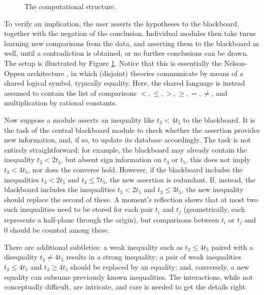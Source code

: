 \documentclass[runningheds]{llncs}
\begin{document}
\begin{figure}[h]
{}\caption{The computational structure.}
\label{fig:bbarch}
\end{figure}



To verify an implication, the user asserts the hypotheses to the blackboard, together with the negation of the conclusion. Individual modules then take turns learning new comparisons from the data, and asserting them to the blackboard as well, until a contradiction is obtained, or no further conclusions can be drawn. The setup is illustrated by Figure \ref{fig:bbarch}. Notice that this is essentially the Nelson-Oppen architecture \cite{barrett:et:al:08} \cite{nelson:oppen:79}, in which (disjoint) theories communicate by means of a shared logical symbol, typically equality. Here, the shared language is instead assumed to contain the list of comparisons $<, \le, >, \ge, =, \neq$, and multiplication by rational constants.

Now suppose a module asserts an inequality like $t_3 < 4 t_5$ to the blackboard. It is the task of the central blackboard module to check whether the assertion provides new information, and, if so, to update its database accordingly. The task is not entirely straightforward: for example, the blackboard may already contain the inequality $t_3 < 2 t_5$, but absent sign information on $t_3$ or $t_5$, this does not imply $t_3 < 4 t_5$, nor does the converse hold. However, if the blackboard includes the inequalities $t_3 < 2 t_5$ and $t_3 \leq 7 t_5$, the new assertion is redundant. If, instead, the blackboard includes the inequalities $t_3 < 2 t_5$ and $t_3 \leq 3 t_5$, the new inequality should replace the second of these. A moment's reflection shows that at most two such inequalities need to be stored for each pair $t_i$ and $t_j$ (geometrically, each represents a half-plane through the origin), but comparisons between $t_i$ or $t_j$ and $0$ should be counted among these.

There are additional subtleties: a weak inequality such as $t_3 \leq 4 t_5$ paired with a disequality $t_3 \neq 4 t_5$ results in a strong inequality; a pair of weak inequalities $t_3 \leq 4 t_5$ and $t_3 \geq 4 t_5$ should be replaced by an equality; and, conversely, a new equality can subsume previously known inequalities. The interactions, while not conceptually difficult, are intricate, and care is needed to get the details right.
\end{document}
